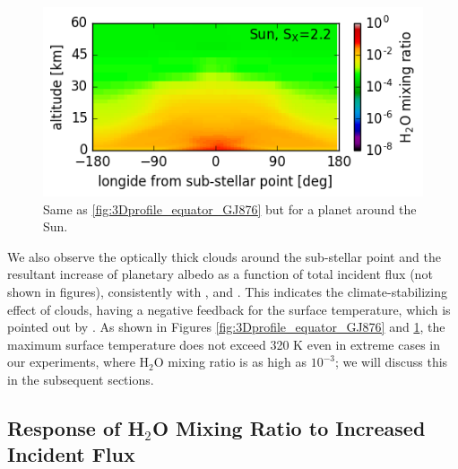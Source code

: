 \documentclass[11pt,numberedappendix,twocolappendix,]{emulateapj}
\def\water{H$_2$O }
\begin{document}
\begin{figure}[!hbt]
\begin{minipage}{0.48\hsize}
\begin{center}
    \end{center}
 \end{minipage}
   \begin{minipage}{0.48\hsize}
    \begin{center}
\includegraphics[width=\hsize]{fig/ANN0006-0012aijlAqOH0TLS_SunS22P202L40Q_xH2O.png}
    \end{center}
 \end{minipage}
    \caption{Same as \ref{fig:3Dprofile_equator_GJ876} but for a planet around the Sun.}
\label{fig:3Dprofile_equator_Sun}
\end{figure}

We also observe the optically thick clouds around the sub-stellar point and the resultant increase of planetary albedo as a function of total incident flux (not shown in figures), consistently with \citet{Yang2013,Yang2014}, and \citet{Way2016}. 
This indicates the climate-stabilizing effect of clouds, having a negative feedback for the surface temperature, which is pointed out by \citet{Yang2013}. 
As shown in Figures \ref{fig:3Dprofile_equator_GJ876} and \ref{fig:3Dprofile_equator_Sun}, the maximum surface temperature does not exceed 320 K even in extreme cases in our experiments, where \water mixing ratio is as high as $10^{-3}$; we will discuss this in the subsequent sections. 


\subsection{Response of \water Mixing Ratio to Increased Incident Flux}
\label{ss:result_H2Omixingratio}
\end{document}
